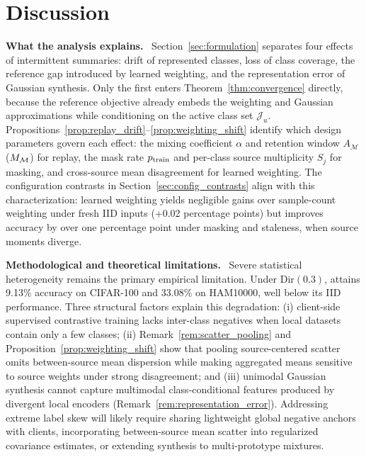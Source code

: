 \section{Discussion}
\label{sec:discussion}

\noindent\textbf{What the analysis explains.}~
Section~\ref{sec:formulation} separates four effects of intermittent summaries: drift of represented classes, loss of class coverage, the reference gap introduced by learned weighting, and the representation error of Gaussian synthesis. Only the first enters Theorem~\ref{thm:convergence} directly, because the reference objective already embeds the weighting and Gaussian approximations while conditioning on the active class set $\mathcal J_u$. Propositions~\ref{prop:replay_drift}--\ref{prop:weighting_shift} identify which design parameters govern each effect: the mixing coefficient $\alpha$ and retention window $A_{\mathcal M}$ ($M_{\mathcal{M}}$) for replay, the mask rate $p_{\mathrm{train}}$ and per-class source multiplicity $S_j$ for masking, and cross-source mean disagreement for learned weighting. The configuration contrasts in Section~\ref{sec:config_contrasts} align with this characterization: learned weighting yields negligible gains over sample-count weighting under fresh IID inputs (+0.02 percentage points) but improves accuracy by over one percentage point under masking and staleness, when source moments diverge.

\noindent\textbf{Methodological and theoretical limitations.}~
Severe statistical heterogeneity remains the primary empirical limitation. Under $\mathrm{Dir}(0.3)$, \ehsfp{} attains 9.13\% accuracy on CIFAR-100 and 33.08\% on HAM10000, well below its IID performance. Three structural factors explain this degradation: (i) client-side supervised contrastive training lacks inter-class negatives when local datasets contain only a few classes; (ii) Remark~\ref{rem:scatter_pooling} and Proposition~\ref{prop:weighting_shift} show that pooling source-centered scatter omits between-source mean dispersion while making aggregated means sensitive to source weights under strong disagreement; and (iii) unimodal Gaussian synthesis cannot capture multimodal class-conditional features produced by divergent local encoders (Remark~\ref{rem:representation_error}). Addressing extreme label skew will likely require sharing lightweight global negative anchors with clients, incorporating between-source mean scatter into regularized covariance estimates, or extending synthesis to multi-prototype mixtures.

